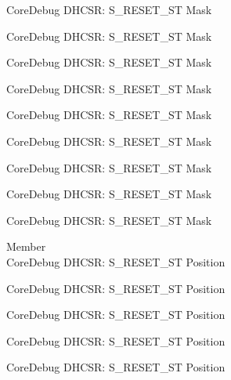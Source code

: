 \begin{DoxyRefList}
\label{deprecated__deprecated000563}%
%
Core\+Debug DHCSR\+: S\+\_\+\+RESET\+\_\+\+ST Mask 

\label{deprecated__deprecated000669}%
%
Core\+Debug DHCSR\+: S\+\_\+\+RESET\+\_\+\+ST Mask 

\label{deprecated__deprecated000769}%
%
Core\+Debug DHCSR\+: S\+\_\+\+RESET\+\_\+\+ST Mask 

\label{deprecated__deprecated000823}%
%
Core\+Debug DHCSR\+: S\+\_\+\+RESET\+\_\+\+ST Mask 

\label{deprecated__deprecated000908}%
%
Core\+Debug DHCSR\+: S\+\_\+\+RESET\+\_\+\+ST Mask 

\label{deprecated__deprecated000965}%
%
Core\+Debug DHCSR\+: S\+\_\+\+RESET\+\_\+\+ST Mask 

\label{deprecated__deprecated001041}%
%
Core\+Debug DHCSR\+: S\+\_\+\+RESET\+\_\+\+ST Mask 

\label{deprecated__deprecated001120}%
%
Core\+Debug DHCSR\+: S\+\_\+\+RESET\+\_\+\+ST Mask 

\label{deprecated__deprecated001222}%
%
Core\+Debug DHCSR\+: S\+\_\+\+RESET\+\_\+\+ST Mask  
\item[Member \doxylink{group___c_m_s_i_s___core_debug_ga6f934c5427ea057394268e541fa97753}{Core\+Debug\+\_\+\+DHCSR\+\_\+\+S\+\_\+\+RESET\+\_\+\+ST\+\_\+\+Pos} ]\hfill \\
\label{deprecated__deprecated000009}%
%
Core\+Debug DHCSR\+: S\+\_\+\+RESET\+\_\+\+ST Position 

\label{deprecated__deprecated000109}%
%
Core\+Debug DHCSR\+: S\+\_\+\+RESET\+\_\+\+ST Position 

\label{deprecated__deprecated000163}%
%
Core\+Debug DHCSR\+: S\+\_\+\+RESET\+\_\+\+ST Position 

\label{deprecated__deprecated000248}%
%
Core\+Debug DHCSR\+: S\+\_\+\+RESET\+\_\+\+ST Position 

\label{deprecated__deprecated000305}%
%
Core\+Debug DHCSR\+: S\+\_\+\+RESET\+\_\+\+ST Position 


\end{DoxyRefList}
